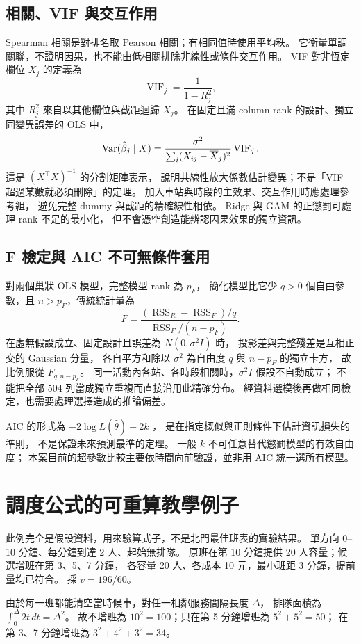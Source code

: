 \subsection{相關、VIF 與交互作用}
Spearman 相關是對排名取 Pearson 相關；有相同值時使用平均秩。
它衡量單調關聯，不證明因果，也不能由低相關排除非線性或條件交互作用。
VIF 對非恆定欄位 $X_j$ 的定義為
\[
\operatorname{VIF}_j=\frac1{1-R_j^2},
\]
其中 $R_j^2$ 來自以其他欄位與截距迴歸 $X_j$。
在固定且滿 column rank 的設計、獨立同變異誤差的 OLS 中，
\[
\operatorname{Var}(\widehat\beta_j\mid X)
=\frac{\sigma^2}{\sum_i(X_{ij}-\overline X_j)^2}\operatorname{VIF}_j.
\]
這是 $(X^\top X)^{-1}$ 的分割矩陣表示，
說明共線性放大係數估計變異；不是「VIF 超過某數就必須刪除」的定理。
加入車站與時段的主效果、交互作用時應處理參考組，
避免完整 dummy 與截距的精確線性相依。
Ridge 與 GAM 的正懲罰可處理 rank 不足的最小化，
但不會憑空創造能辨認因果效果的獨立資訊。

\subsection{F 檢定與 AIC 不可無條件套用}
對兩個巢狀 OLS 模型，完整模型 rank 為 $p_F$，
簡化模型比它少 $q>0$ 個自由參數，且 $n>p_F$，傳統統計量為
\[
F=\frac{(\operatorname{RSS}_R-\operatorname{RSS}_F)/q}
{\operatorname{RSS}_F/(n-p_F)}.
\]
在虛無假設成立、固定設計且誤差為 $N(0,\sigma^2I)$ 時，
投影差與完整殘差是互相正交的 Gaussian 分量，
各自平方和除以 $\sigma^2$ 為自由度 $q$ 與 $n-p_F$ 的獨立卡方，
故比例服從 $F_{q,n-p_F}$。
同一活動內各站、各時段相關時，$\sigma^2I$ 假設不自動成立；
不能把全部 504 列當成獨立重複而直接沿用此精確分布。
經資料選模後再做相同檢定，也需要處理選擇造成的推論偏差。

AIC 的形式為 $-2\log L(\widehat\theta)+2k$ \cite{aic}，
是在指定概似與正則條件下估計資訊損失的準則，
不是保證未來預測最準的定理。
一般 $k$ 不可任意替代懲罰模型的有效自由度；
本案目前的超參數比較主要依時間向前驗證，並非用 AIC 統一選所有模型。

\section{調度公式的可重算教學例子}

此例完全是假設資料，用來驗算式子，不是北門最佳班表的實驗結果。
單方向 0--10 分鐘、每分鐘到達 2 人、起始無排隊。
原班在第 10 分鐘提供 20 人容量；候選增班在第 3、5、7 分鐘，
各容量 20 人、各成本 10 元，最小班距 3 分鐘，提前量均已符合。
採 $v=196/60$。

由於每一班都能清空當時候車，對任一相鄰服務間隔長度 $\Delta$，
排隊面積為 $\int_0^\Delta2t\,dt=\Delta^2$。
故不增班為 $10^2=100$；只在第 5 分鐘增班為 $5^2+5^2=50$；
在第 3、7 分鐘增班為 $3^2+4^2+3^2=34$。

